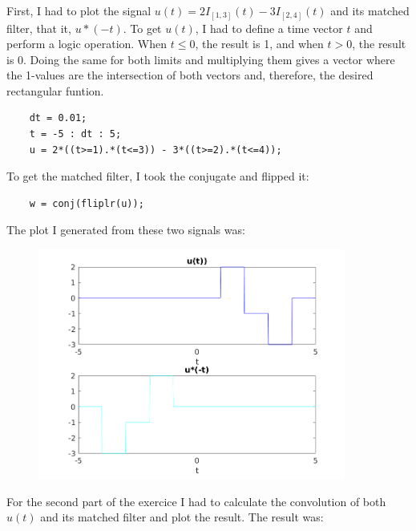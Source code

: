 \documentclass[a4paper,11pt]{article}
\begin{document}
First, I had to plot the signal $u(t) = 2I_{[1,3]}(t) - 3I_{[2,4]}(t)$ and its matched filter, that it, $u*(-t)$. To get $u(t)$, I had to define a time vector $t$ and perform a logic operation. When $t\leq 0$, the result is 1, and when $t > 0$, the result is 0. Doing the same for both limits and multiplying them gives a vector where the 1-values are the intersection of both vectors and, therefore, the desired rectangular funtion. 

\bigskip

\begin{lstlisting}
    dt = 0.01;
    t = -5 : dt : 5;
    u = 2*((t>=1).*(t<=3)) - 3*((t>=2).*(t<=4));
\end{lstlisting}

\bigskip

To get the matched filter, I took the conjugate and flipped it:

\bigskip

\begin{lstlisting}
    w = conj(fliplr(u));
\end{lstlisting}

\bigskip

The plot I generated from these two signals was:

\begin{figure}[!hp]
    \begin{center}
      \includegraphics[width=0.9\textwidth]{images/exercice_3a.png}
    \end{center}
\end{figure}

\newpage

For the second part of the exercice I had to calculate the convolution of both $u(t)$ and its matched filter and plot the result. The result was:
\end{document}
